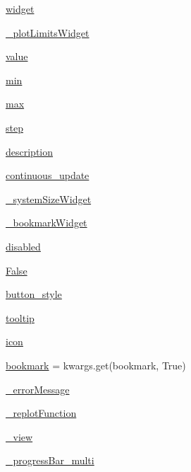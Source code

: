 \begin{DoxyCompactItemize}
\item 
\hyperlink{namespace_mu_mo_t_1_1_mu_mo_t_a60d5947424f4fcd4ca9ed05e6dc43227}{widget}
\item 
\hyperlink{namespace_mu_mo_t_1_1_mu_mo_t_a7f7ea1e7e5688cb25a6651783db498e0}{\+\_\+plot\+Limits\+Widget}
\item 
\hyperlink{namespace_mu_mo_t_1_1_mu_mo_t_afcc7a4b78ecd8fa7e713f8cfa0f51017}{value}
\item 
\hyperlink{namespace_mu_mo_t_1_1_mu_mo_t_a4735a0c4d1b11f62ea44115d54a93087}{min}
\item 
\hyperlink{namespace_mu_mo_t_1_1_mu_mo_t_aa83862769f78fffb512bc9283007ef67}{max}
\item 
\hyperlink{namespace_mu_mo_t_1_1_mu_mo_t_ae5f3bfeb7e3cb5c8bc769d5504ebeeae}{step}
\item 
\hyperlink{namespace_mu_mo_t_1_1_mu_mo_t_a2661f439a4a94ffdcd5e47ae1da0bb1d}{description}
\item 
\hyperlink{namespace_mu_mo_t_1_1_mu_mo_t_a20bd12ee79cb933d87e4f9a695c5fbd5}{continuous\+\_\+update}
\item 
\hyperlink{namespace_mu_mo_t_1_1_mu_mo_t_ab1e13c5ff312caa1398f9de296be2319}{\+\_\+system\+Size\+Widget}
\item 
\hyperlink{namespace_mu_mo_t_1_1_mu_mo_t_ae7a084d9f77bbda4a99577633ef002ce}{\+\_\+bookmark\+Widget}
\item 
\hyperlink{namespace_mu_mo_t_1_1_mu_mo_t_a167f3d1d219cdeb0285ec26cc28c2275}{disabled}
\item 
\hyperlink{namespace_mu_mo_t_1_1_mu_mo_t_a36cde68b055f3f2ee671020af4ccf4e2}{False}
\item 
\hyperlink{namespace_mu_mo_t_1_1_mu_mo_t_acc4cd4be0b498adad4d50e6b2155f360}{button\+\_\+style}
\item 
\hyperlink{namespace_mu_mo_t_1_1_mu_mo_t_a521eab1d148d9186af26599d212f8eaa}{tooltip}
\item 
\hyperlink{namespace_mu_mo_t_1_1_mu_mo_t_adcfe65234f2988b807bc263671a3e49b}{icon}
\item 
\hyperlink{namespace_mu_mo_t_1_1_mu_mo_t_a20e7c7ee8dc02fc32860e9dd64159a29}{bookmark} = kwargs.\+get(\textquotesingle{}bookmark\textquotesingle{}, True)
\item 
\hyperlink{namespace_mu_mo_t_1_1_mu_mo_t_afb9cc1f1f0c08393b454f526842425cc}{\+\_\+error\+Message}
\item 
\hyperlink{namespace_mu_mo_t_1_1_mu_mo_t_a04e66f2b7e3c67b0e96f318acbfa7f0e}{\+\_\+replot\+Function}
\item 
\hyperlink{namespace_mu_mo_t_1_1_mu_mo_t_a27dd8543b5188cdfe40f622d267fe2c5}{\+\_\+view}
\item 
\hyperlink{namespace_mu_mo_t_1_1_mu_mo_t_a1da52cde6b2b94a1005eaa6898d2f8c5}{\+\_\+progress\+Bar\+\_\+multi}
\end{DoxyCompactItemize}


